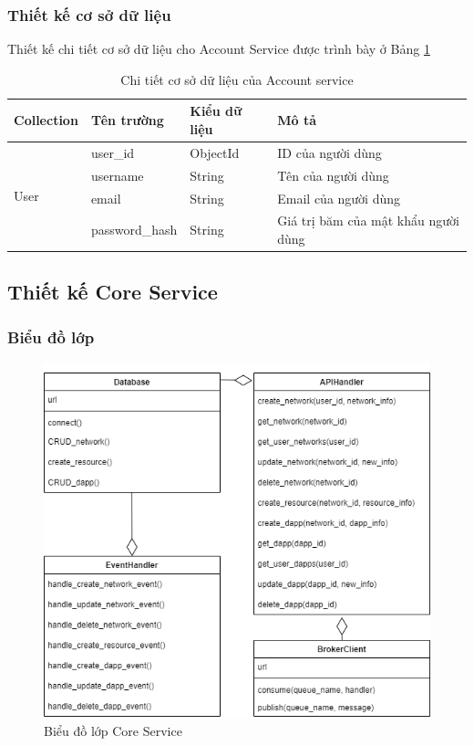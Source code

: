 \documentclass[../DoAn.tex]{subfiles}
\begin{document}
\subsubsection{Thiết kế cơ sở dữ liệu}

Thiết kế chi tiết cơ sở dữ liệu cho Account Service được trình bày ở Bảng
\ref{tab:dbAccountService}

\begin{longtable}{|p{}|p{}|p{}|p{}|}
    \caption{Chi tiết cơ sở dữ liệu của Account service}
    \label{tab:dbAccountService}                                                                               \\
    \hline
    Collection                           & Tên trường     & Kiểu dữ liệu & Mô tả                               \\ \hline
    \multirow[t]{4}{0.2\textwidth}{User} & user\_id       & ObjectId     & ID của người dùng                   \\ \cline{2-4}
                                         & username       & String       & Tên của người dùng                  \\ \cline{2-4}
                                         & email          & String       & Email của người dùng                \\ \cline{2-4}
                                         & password\_hash & String       & Giá trị băm của mật khẩu người dùng \\ \hline
\end{longtable}

\subsection{Thiết kế Core Service}

\subsubsection{Biểu đồ lớp}

\begin{figure}[H]
    \centering
    \includegraphics[width=0.75\linewidth]{Hinhve/DoAn-ClassCoreService.drawio.png}
    \caption{Biểu đồ lớp Core Service}
    \label{fig:classCoreService}
\end{figure}
\end{document}
